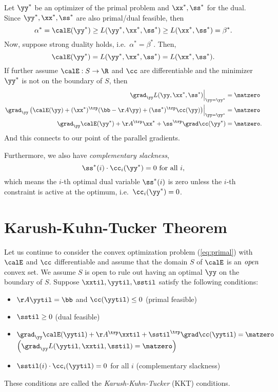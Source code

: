 Let $\yy^*$ be an optimizer of the primal problem and $\xx^*, \ss^*$ for the dual. Since $\yy^*, \xx^*, \ss^*$ are also primal/dual feasible, then
\[ \alpha^* = \calE(\yy^*) \geq L(\yy^*, \xx^*, \ss^*) \geq L(\xx^*, \ss^*) = \beta^*. \]
Now, suppose strong duality holds, i.e.\ $\alpha^* = \beta^*$. Then,
\[ \calE(\yy^*) = L(\yy^*, \xx^*, \ss^*) = L(\xx^*, \ss^*). \]
If further assume $\calE: S \to \R$ and $\cc$ are differentiable and the minimizer $\yy^*$ is not on the boundary of $S$, then
\begin{align*}
  \left.\grad_{\yy}L(\yy, \xx^*, \ss^*)\right|_{\yy=\yy^*} &= \matzero \\
  \left.\grad_{\yy} \left( \calE(\yy) + (\xx^*)^\trp(\bb - \AA\yy) + (\ss^*)^\trp\cc(\yy) \right) \right|_{\yy=\yy^*} &= \matzero \\
  \grad_{\yy}\calE(\yy^*) + \AA^\trp\xx^* + \ss^\trp\grad\cc(\yy^*) &= \matzero.
\end{align*}
And this connects to our point of the parallel gradients.

Furthermore, we also have \emph{complementary slackness},
\[ \ss^*(i)\cdot\cc_i(\yy^*) = 0 \text{ for all } i, \]
which means the $i$-th optimal dual variable $\ss^*(i)$ is zero unless the $i$-th constraint is active at the optimum, i.e.\ $\cc_i(\yy^*)=0$.


\section{Karush-Kuhn-Tucker Theorem}
Let us continue to consider the convex optimization problem
(\ref{eq:primal}) with $\calE$ and $\cc$ differentiable and assume
that the domain $S$ of $\calE$ is an $\emph{open}$ convex set.
We assume $S$ is open to rule out having an optimal $\yy$ on the
boundary of $S$.
Suppose $\xxtil, \yytil, \sstil$ satisfy the following conditions:
\begin{itemize}
  \item $\AA\yytil = \bb$ and $\cc(\yytil) \leq 0$ \hfill (primal feasible)
  \item $\sstil \geq 0$ \hfill (dual feasible)
  \item $\grad_{\yy}\calE(\yytil) + \AA^\trp\xxtil + \sstil^\trp\grad\cc(\yytil) = \matzero$ \hfill $\left(\grad_{\yy}L(\yytil,\xxtil, \sstil)=\matzero\right)$
  \item $\sstil(i)\cdot\cc_i(\yytil) = 0$ for all $i$ \hfill (complementary slackness)
\end{itemize}
These conditions are called the \emph{Karush-Kuhn-Tucker} (KKT) conditions.

